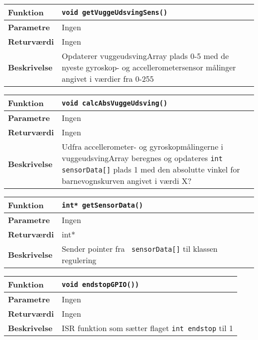\begin{center}
    \begin{tabular}{ | l | p{} |}
    \hline
    \textbf{Funktion}	& \verb+void getVuggeUdsvingSens() +				\\ \hline
    \textbf{Parametre} 	& Ingen							 		\\ \hline
    \textbf{Returværdi}	& Ingen									\\ \hline
    \textbf{Beskrivelse}	& Opdaterer vuggeudsvingArray plads 0-5 med de nyeste gyroskop- og accellerometersensor målinger angivet i værdier fra 0-255	\\ \hline
    \end{tabular}
\end{center}

\begin{center}
    \begin{tabular}{ | l | p{} |}
    \hline
    \textbf{Funktion}	& \verb+void calcAbsVuggeUdsving() +				\\ \hline
    \textbf{Parametre} 	& Ingen							 		\\ \hline
    \textbf{Returværdi}	& Ingen									\\ \hline
    \textbf{Beskrivelse}	& Udfra accellerometer- og gyroskopmålingerne i vuggeudsvingArray beregnes og opdateres \verb+int sensorData[]+ plads 1 med den absolutte vinkel for barnevognskurven angivet i værdi X?	\\ \hline
    \end{tabular}
\end{center}

\begin{center}
    \begin{tabular}{ | l | p{} |}
    \hline
    \textbf{Funktion}	& \verb+int* getSensorData() +				\\ \hline
    \textbf{Parametre} 	& Ingen							 		\\ \hline
    \textbf{Returværdi}	& int*									\\ \hline
    \textbf{Beskrivelse}	& Sender pointer fra \verb+ sensorData[]+ til klassen regulering	\\ \hline
    \end{tabular}
\end{center}

\begin{center}
    \begin{tabular}{ | l | p{} |}
    \hline
    \textbf{Funktion}	& \verb+void endstopGPIO()) +				\\ \hline
    \textbf{Parametre} 	& Ingen							 		\\ \hline
    \textbf{Returværdi}	& Ingen						\\ \hline
    \textbf{Beskrivelse}	& ISR funktion som sætter flaget \verb+int endstop+ til 1	\\ \hline
    \end{tabular}
\end{center}

